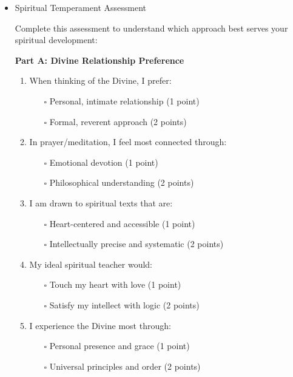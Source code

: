 \documentclass[11pt,twoside]{book}
\begin{document}
\begin{itemize}
\item Spiritual Temperament Assessment
\label{sec:org3f2332d}

Complete this assessment to understand which approach best serves your spiritual development:

\textbf{\textbf{Part A: Divine Relationship Preference}}

\begin{enumerate}
\item When thinking of the Divine, I prefer:
\begin{itemize}
\item[{$\square$}] Personal, intimate relationship (1 point)
\item[{$\square$}] Formal, reverent approach (2 points)
\end{itemize}

\item In prayer/meditation, I feel most connected through:
\begin{itemize}
\item[{$\square$}] Emotional devotion (1 point)
\item[{$\square$}] Philosophical understanding (2 points)
\end{itemize}

\item I am drawn to spiritual texts that are:
\begin{itemize}
\item[{$\square$}] Heart-centered and accessible (1 point)
\item[{$\square$}] Intellectually precise and systematic (2 points)
\end{itemize}

\item My ideal spiritual teacher would:
\begin{itemize}
\item[{$\square$}] Touch my heart with love (1 point)
\item[{$\square$}] Satisfy my intellect with logic (2 points)
\end{itemize}

\item I experience the Divine most through:
\begin{itemize}
\item[{$\square$}] Personal presence and grace (1 point)
\item[{$\square$}] Universal principles and order (2 points)
\end{itemize}
\end{enumerate}


\end{itemize}
\end{document}
